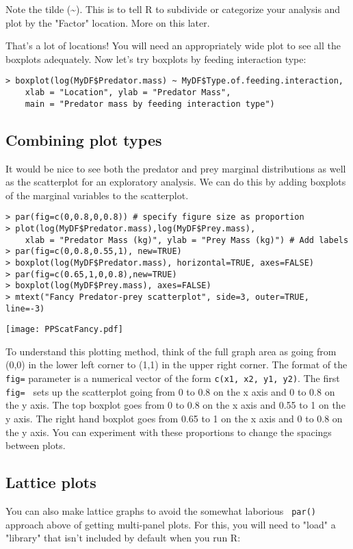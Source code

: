 Note the tilde (\textasciitilde). This is to tell R to subdivide or 
categorize your analysis and plot by the "Factor" location. More on 
this later. 

That's a lot of locations! You will need an appropriately wide plot to 
see all the boxplots adequately. Now let's try boxplots by feeding 
interaction type: 
\begin{lstlisting}
> boxplot(log(MyDF$Predator.mass) ~ MyDF$Type.of.feeding.interaction,
	xlab = "Location", ylab = "Predator Mass",
	main = "Predator mass by feeding interaction type")
\end{lstlisting}

\subsection{Combining plot types}

It would be nice to see both the predator and prey marginal 
distributions as well as the scatterplot for an exploratory analysis. 
We can do this by adding boxplots of the marginal variables to the scatterplot. 

\begin{lstlisting}
> par(fig=c(0,0.8,0,0.8)) # specify figure size as proportion
> plot(log(MyDF$Predator.mass),log(MyDF$Prey.mass),
    xlab = "Predator Mass (kg)", ylab = "Prey Mass (kg)") # Add labels
> par(fig=c(0,0.8,0.55,1), new=TRUE)
> boxplot(log(MyDF$Predator.mass), horizontal=TRUE, axes=FALSE)
> par(fig=c(0.65,1,0,0.8),new=TRUE)
> boxplot(log(MyDF$Prey.mass), axes=FALSE)
> mtext("Fancy Predator-prey scatterplot", side=3, outer=TRUE, line=-3)
\end{lstlisting}

\begin{center}
   \texttt{[image: PPScatFancy.pdf]} 
\end{center}
To understand this plotting method, think of the full graph area as 
going from (0,0) in the lower left corner to (1,1) in the upper right 
corner. The format of the {\tt fig=} parameter is a numerical vector of 
the form {\tt c(x1, x2, y1, y2)}. The first {\tt fig= } sets up the 
scatterplot going from 0 to 0.8 on the x axis and 0 to 0.8 on the y 
axis. The top boxplot goes from 0 to 0.8 on the x axis and 0.55 to 1 on 
the y axis. The right hand boxplot goes from 0.65 to 1 on the x axis 
and 0 to 0.8 on the y axis. You can experiment with these proportions 
to change the spacings between plots.

\subsection{Lattice plots}
You can also make lattice graphs to avoid the somewhat laborious {\tt 
par()} approach above of getting multi-panel plots. For this, you will 
need to "load" a "library" that isn't included by default when you run 
R: 

